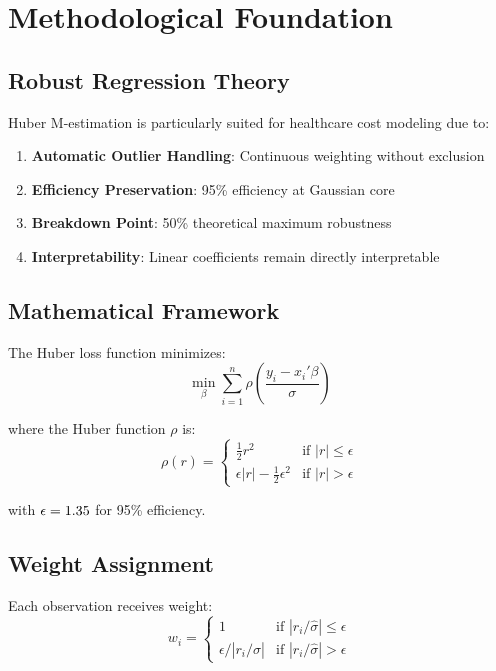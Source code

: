 \section{Methodological Foundation}

\subsection{Robust Regression Theory}

Huber M-estimation is particularly suited for healthcare cost modeling due to:

\begin{enumerate}
    \item \textbf{Automatic Outlier Handling}: Continuous weighting without exclusion
    \item \textbf{Efficiency Preservation}: 95\% efficiency at Gaussian core
    \item \textbf{Breakdown Point}: 50\% theoretical maximum robustness
    \item \textbf{Interpretability}: Linear coefficients remain directly interpretable
\end{enumerate}

\subsection{Mathematical Framework}

The Huber loss function minimizes:
\begin{equation}
\min_\beta \sum_{i=1}^{n} \rho\left(\frac{y_i - x_i'\beta}{\sigma}\right)
\end{equation}

where the Huber function $\rho$ is:
\begin{equation}
\rho(r) = \begin{cases}
\frac{1}{2}r^2 & \text{if } |r| \leq \epsilon \\
\epsilon|r| - \frac{1}{2}\epsilon^2 & \text{if } |r| > \epsilon
\end{cases}
\end{equation}

with $\epsilon = 1.35{}$ for 95\% efficiency.

\subsection{Weight Assignment}

Each observation receives weight:
\begin{equation}
w_i = \begin{cases}
1 & \text{if } |r_i/\hat{\sigma}| \leq \epsilon \\
\epsilon / |r_i/\hat{\sigma}| & \text{if } |r_i/\hat{\sigma}| > \epsilon
\end{cases}
\end{equation}

